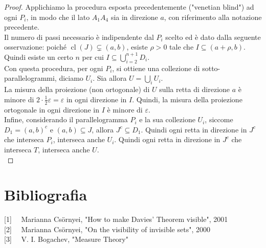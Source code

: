 \documentclass[a4paper, twoside,openright]{article}
\newcommand{\<}{\langle}
\renewcommand{\>}{\rangle}
\begin{document}
\begin{proof}
	Applichiamo la procedura esposta precedentemente ("venetian blind") ad ogni $P_i$, in modo che il lato $A_1A_4$ sia in direzione $a$, con riferimento alla notazione precedente.\\
	Il numero di passi necessario è indipendente dal $P_i$ scelto ed è dato dalla seguente osservazione: poiché $\operatorname{cl}(J) \subsetneq(a, b)$, esiste $\rho >0$ tale che $I \subseteq (a+\rho,b)$. Quindi esiste un certo $n$ per cui $I \subseteq \bigcup_{i=2}^{n+1}D_i$.\\
	Con questa procedura, per ogni $P_i$, si ottiene una collezione di sotto-parallelogrammi, diciamo $U_i$. Sia allora $U = \bigcup_i U_i$.\\
	La misura della proiezione (non ortogonale) di $U$ sulla retta di direzione $a$ è minore di $2 \cdot \frac{1}{2} \varepsilon=\varepsilon$ in ogni direzione in $I$. Quindi, la misura della proiezione ortogonale in ogni direzione in $I$ è minore di $\varepsilon$.\\
	Infine, considerando il parallelogramma $P_i$ e la sua collezione $U_i$, siccome $D_1 =(a,b)^c$ e $(a,b) \subseteq J$, allora $J^c \subseteq D_1$. Quindi ogni retta in direzione in $J^c$ che interseca $P_i$, interseca anche $U_i$. Quindi ogni retta in direzione in $J^c$ che interseca $T$, interseca anche $U$. \\
\end{proof}

\newpage

\section{Bibliografia}

[1] \ \ Marianna Cs\"{o}rnyei, "How to make Davies' Theorem visible", 2001\\

[2] \ \ Marianna Cs\"{o}rnyei, "On the visibility of invisible sets", 2000\\

[3] \ \ V. I. Bogachev, "Measure Theory"
\end{document}
